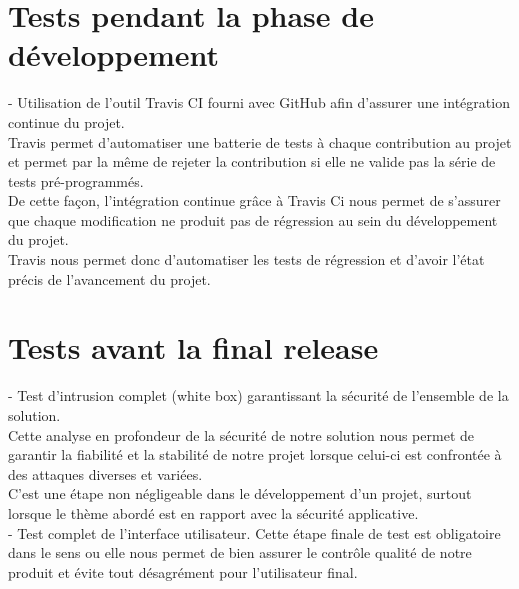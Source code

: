 \section{Tests pendant la phase de développement}
- Utilisation de l'outil Travis CI fourni avec GitHub afin d'assurer une intégration continue du projet.\\
Travis permet d'automatiser une batterie de tests à chaque contribution au projet et permet par la même de rejeter la contribution si elle ne valide pas la série de tests pré-programmés.\\
De cette façon, l'intégration continue grâce à Travis Ci nous permet de s'assurer que chaque modification ne produit pas de régression au sein du développement du projet.\\
 
Travis nous permet donc d'automatiser les tests de régression et d'avoir l'état précis de l'avancement du projet.\\

\section{Tests avant la final release}
- Test d'intrusion complet (white box) garantissant la sécurité de l'ensemble de la solution.\\
Cette analyse en profondeur de la sécurité de notre solution nous permet de garantir la fiabilité et la stabilité de notre projet lorsque celui-ci est confrontée à des attaques diverses et variées.\\
C'est une étape non négligeable dans le développement d'un projet, surtout lorsque le thème abordé est en rapport avec la sécurité applicative.\\
- Test complet de l'interface utilisateur. Cette étape finale de test est obligatoire dans le sens ou elle nous permet de bien assurer le contrôle qualité de notre produit et évite tout désagrément pour l'utilisateur final.\\